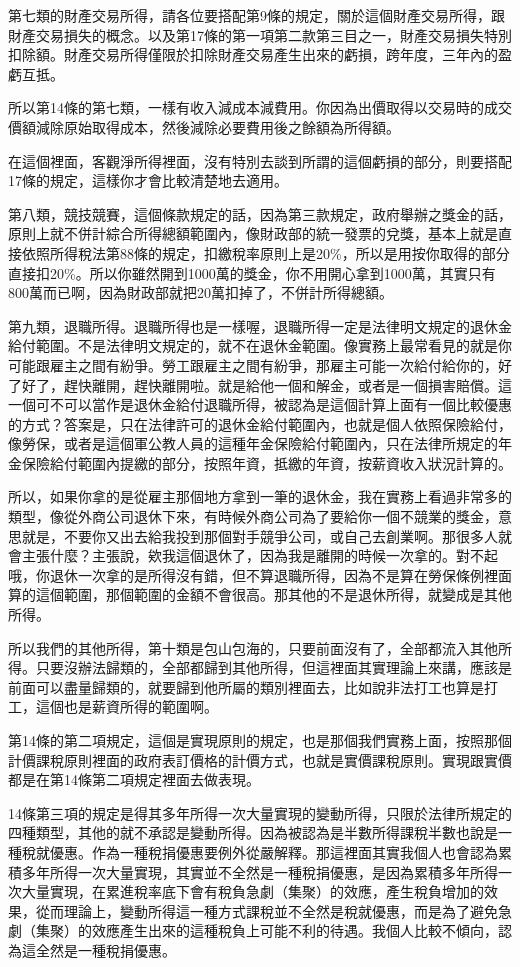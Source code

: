\documentclass[oneside,sub3section]{ctexbook}
\begin{document}
第七類的財產交易所得，請各位要搭配第9條的規定，關於這個財產交易所得，跟財產交易損失的概念。以及第17條的第一項第二款第三目之一，財產交易損失特別扣除額。財產交易所得僅限於扣除財產交易產生出來的虧損，跨年度，三年內的盈虧互抵。

所以第14條的第七類，一樣有收入減成本減費用。你因為出價取得以交易時的成交價額減除原始取得成本，然後減除必要費用後之餘額為所得額。

在這個裡面，客觀淨所得裡面，沒有特別去談到所謂的這個虧損的部分，則要搭配17條的規定，這樣你才會比較清楚地去適用。

第八類，競技競賽，這個條款規定的話，因為第三款規定，政府舉辦之獎金的話，原則上就不併計綜合所得總額範圍內，像財政部的統一發票的兌獎，基本上就是直接依照所得稅法第88條的規定，扣繳稅率原則上是20\%，所以是用按你取得的部分直接扣20\%。所以你雖然開到1000萬的獎金，你不用開心拿到1000萬，其實只有800萬而已啊，因為財政部就把20萬扣掉了，不併計所得總額。

第九類，退職所得。退職所得也是一樣喔，退職所得一定是法律明文規定的退休金給付範圍。不是法律明文規定的，就不在退休金範圍。像實務上最常看見的就是你可能跟雇主之間有紛爭。勞工跟雇主之間有紛爭，那雇主可能一次給付給你的，好了好了，趕快離開，趕快離開啦。就是給他一個和解金，或者是一個損害賠償。這一個可不可以當作是退休金給付退職所得，被認為是這個計算上面有一個比較優惠的方式？答案是，只在法律許可的退休金給付範圍內，也就是個人依照保險給付，像勞保，或者是這個軍公教人員的這種年金保險給付範圍內，只在法律所規定的年金保險給付範圍內提繳的部分，按照年資，抵繳的年資，按薪資收入狀況計算的。

所以，如果你拿的是從雇主那個地方拿到一筆的退休金，我在實務上看過非常多的類型，像從外商公司退休下來，有時候外商公司為了要給你一個不競業的獎金，意思就是，不要你又出去給我投到那個對手競爭公司，或自己去創業啊。那很多人就會主張什麼？主張說，欸我這個退休了，因為我是離開的時候一次拿的。對不起哦，你退休一次拿的是所得沒有錯，但不算退職所得，因為不是算在勞保條例裡面算的這個範圍，那個範圍的金額不會很高。那其他的不是退休所得，就變成是其他所得。

所以我們的其他所得，第十類是包山包海的，只要前面沒有了，全部都流入其他所得。只要沒辦法歸類的，全部都歸到其他所得，但這裡面其實理論上來講，應該是前面可以盡量歸類的，就要歸到他所屬的類別裡面去，比如說非法打工也算是打工，這個也是薪資所得的範圍啊。

第14條的第二項規定，這個是實現原則的規定，也是那個我們實務上面，按照那個計價課稅原則裡面的政府表訂價格的計價方式，也就是實價課稅原則。實現跟實價都是在第14條第二項規定裡面去做表現。

14條第三項的規定是得其多年所得一次大量實現的變動所得，只限於法律所規定的四種類型，其他的就不承認是變動所得。因為被認為是半數所得課稅半數也說是一種稅就優惠。作為一種稅捐優惠要例外從嚴解釋。那這裡面其實我個人也會認為累積多年所得一次大量實現，其實並不全然是一種稅捐優惠，是因為累積多年所得一次大量實現，在累進稅率底下會有稅負急劇（集聚）的效應，產生稅負增加的效果，從而理論上，變動所得這一種方式課稅並不全然是稅就優惠，而是為了避免急劇（集聚）的效應產生出來的這種稅負上可能不利的待遇。我個人比較不傾向，認為這全然是一種稅捐優惠。
\end{document}
